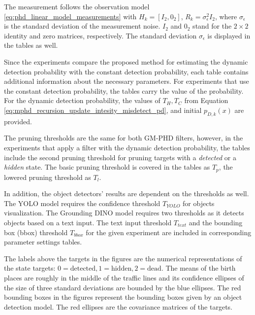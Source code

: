 The measurement follows the observation model \eqref{eq:phd_linear_model_measurements} with $H_k = [I_2, 0_2]$, $R_k
= \sigma_{\epsilon}^2I_2$, where $ \sigma_{\epsilon}$ is the standard deviation of the measurement noise.  $I_2$ and $0_2$ stand for
the $2\times 2$ identity and zero matrices, respectively.
The standard deviation $\sigma_{\epsilon}$ is displayed in the tables as well.

Since the experiments compare the proposed method for estimating the dynamic detection probability with the constant
detection probability, each table contains additional information about the necessary parameters. For experiments that
use the constant
detection probability, the tables carry the value of the probability. For the dynamic detection probability, the values of $T_H, T_C$
from Equation \eqref{eq:mphd_recursion_update_intesity_misdetect_pd},
and initial $p_{D,k}(x)$ are provided.

The pruning thresholds are the same for both GM-PHD filters, however, in the experiments that apply a filter with the
dynamic detection probability, the tables
include the second pruning threshold for pruning targets with a \textit{detected} or a \textit{hidden} state. The basic
pruning threshold is covered in the tables as $T_p$, the lowered pruning threshold as $T_l$.

In addition, the object detectors' results are dependent on the thresholds as well. The YOLO model requires the confidence
threshold $T_{YOLO}$ for objects visualization. The Grounding DINO model requires two thresholds as it detects objects based on a text input. The text input threshold $T_{text}$ and the bounding box (bbox) threshold $T_{bbox}$ for the given experiment are included in corresponding parameter settings tables.

The labels above
the targets in the figures are the numerical representations of the state targets: $0=\text{detected}, 1=\text{hidden}, 2=\text{dead}$. The means of the birth places are roughly in the middle of the traffic lines and its confidence ellipses of the size of
three standard
deviations are bounded by the blue ellipses. The red bounding boxes in the figures represent the bounding
boxes given by an object detection model. The red ellipses are the covariance matrices of the targets.
















